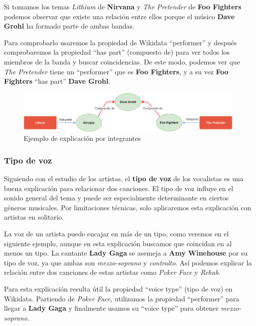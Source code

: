 Si tomamos los temas \textit{Lithium} de \textbf{Nirvana} y \textit{The Pretender} de \textbf{Foo Fighters} podemos observar que existe una relación entre ellos porque el músico \textbf{Dave Grohl} ha formado parte de ambas bandas.

Para comprobarlo usaremos la propiedad de Wikidata ``performer'' y después comprobaremos la propiedad ``has part'' (compuesto de) para ver todos los miembros de la banda y buscar coincidencias. De este modo, podemos ver que \textit{The Pretender} tiene un ``performer'' que es \textbf{Foo Fighters}, y a su vez \textbf{Foo Fighters} ``has part'' \textbf{Dave Grohl}.

\begin{figure}[h!]
	\centering
	\includegraphics[width = 1\textwidth]{Imagenes/Bitmap/Integrante ejemplo.png}
	\caption{Ejemplo de explicación por integrantes}
	\label{fig:sampleImage}
\end{figure}

\subsubsection*{Tipo de voz}

Siguiendo con el estudio de los artistas, el \textbf{tipo de voz} de los vocalistas es una buena explicación para relacionar dos canciones. El tipo de voz influye en el sonido general del tema y puede ser especialmente determinante en ciertos géneros musicales. Por limitaciones técnicas, solo aplicaremos esta explicación con artistas en solitario.

La voz de un artista puede encajar en más de un tipo, como veremos en el siguiente ejemplo, aunque en esta explicación buscamos que coincidan en al menos un tipo. La cantante \textbf{Lady Gaga} se asemeja a \textbf{Amy Winehouse} por su tipo de voz, ya que ambas son \textit{mezzo-soprano} y \textit{contralto}. Así podemos explicar la relación entre dos canciones de estas artistas como \textit{Poker Face} y \textit{Rehab}.

Para esta explicación resulta útil la propiedad ``voice type'' (tipo de voz) en Wikidata. Partiendo de \textit{Poker Face}, utilizamos la propiedad ``performer'' para llegar a \textbf{Lady Gaga} y finalmente usamos su ``voice type'' para obtener \textit{mezzo-soprano}.

